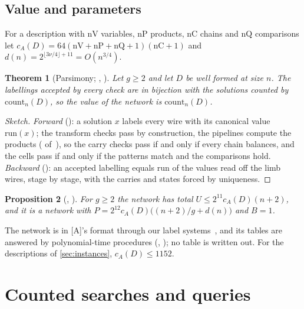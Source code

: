 \documentclass[10pt]{amsart}
\theoremstyle{plain}
\newtheorem{theorem}{Theorem}[section]
\newtheorem{proposition}[theorem]{Proposition}
\theoremstyle{definition}
\theoremstyle{remark}
\numberwithin{equation}{section}
\newcommand{\A}{\textup{[A]}}
\begin{document}
\subsection{Value and parameters}
For a description with $\mathrm{nV}$ variables, $\mathrm{nP}$ products, $\mathrm{nC}$ chains and
$\mathrm{nQ}$ comparisons let $c_A(D)=64(\mathrm{nV}+\mathrm{nP}+\mathrm{nQ}+1)(\mathrm{nC}+1)$ and
$d(n)=2^{\lfloor3\nu/4\rfloor+11}=O(n^{3/4})$.

\begin{theorem}[Parsimony; , ]\label{thm:value}
Let $g\ge2$ and let $D$ be well formed at size $n$. The labellings accepted by every check are in bijection
with the solutions counted by $\mathrm{count}_n(D)$, so the value of the network is $\mathrm{count}_n(D)$.
\end{theorem}

\begin{proof}[Sketch]
\emph{Forward} (): a solution $x$ labels every wire with its canonical value
$\mathrm{run}(x)$; the transform checks pass by construction, the pipelines compute the products
( of~\cite{TulFac26}), so the carry checks pass if and only if every chain balances,
and the cells pass if and only if the patterns match and the comparisons hold. \emph{Backward}
(): an accepted labelling equals $\mathrm{run}$ of the values read off the limb wires,
stage by stage, with the carries and states forced by uniqueness.
\end{proof}

\begin{proposition}[, ]\label{prop:params}
For $g\ge2$ the network has total $U\le2^{11}c_A(D)(n+2)$, and it is a network with
$P=2^{12}c_A(D)\bigl((n+2)/g+d(n)\bigr)$ and $B=1$.
\end{proposition}

\noindent The network is in \A's  format through our label systems~\cite{Tul26}, and its
tables are answered by polynomial-time procedures (, ); no table is
written out. For the descriptions of \cref{sec:instances}, $c_A(D)\le1152$.

\section{Counted searches and queries}\label{sec:machines}
\end{document}
